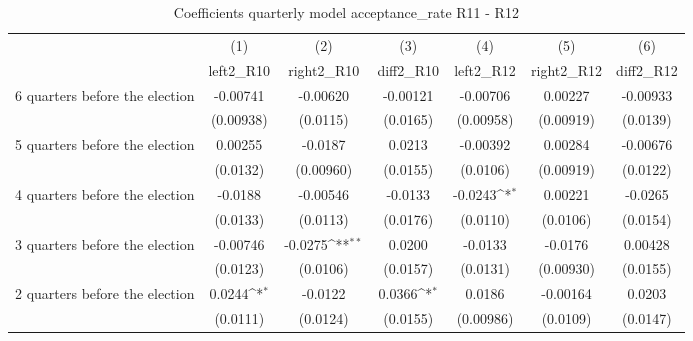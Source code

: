 \begin{table}[!ht]\centering \footnotesize
\def\sym#1{\ifmmode^{#1}\else\(^{#1}\)\fi}
\caption{Coefficients quarterly model acceptance\_rate R11 - R12}
\begin{tabular}{l*{6}{c}}
\hline\hline
                    &\multicolumn{1}{c}{(1)}&\multicolumn{1}{c}{(2)}&\multicolumn{1}{c}{(3)}&\multicolumn{1}{c}{(4)}&\multicolumn{1}{c}{(5)}&\multicolumn{1}{c}{(6)}\\
                    &\multicolumn{1}{c}{left2\_R10}&\multicolumn{1}{c}{right2\_R10}&\multicolumn{1}{c}{diff2\_R10}&\multicolumn{1}{c}{left2\_R12}&\multicolumn{1}{c}{right2\_R12}&\multicolumn{1}{c}{diff2\_R12}\\
\hline
 6 quarters before the election&    -0.00741         &    -0.00620         &    -0.00121         &    -0.00706         &     0.00227         &    -0.00933         \\
                    &   (0.00938)         &    (0.0115)         &    (0.0165)         &   (0.00958)         &   (0.00919)         &    (0.0139)         \\
[1em]
 5 quarters before the election&     0.00255         &     -0.0187         &      0.0213         &    -0.00392         &     0.00284         &    -0.00676         \\
                    &    (0.0132)         &   (0.00960)         &    (0.0155)         &    (0.0106)         &   (0.00919)         &    (0.0122)         \\
[1em]
 4 quarters before the election&     -0.0188         &    -0.00546         &     -0.0133         &     -0.0243\sym{*}  &     0.00221         &     -0.0265         \\
                    &    (0.0133)         &    (0.0113)         &    (0.0176)         &    (0.0110)         &    (0.0106)         &    (0.0154)         \\
[1em]
 3 quarters before the election&    -0.00746         &     -0.0275\sym{**} &      0.0200         &     -0.0133         &     -0.0176         &     0.00428         \\
                    &    (0.0123)         &    (0.0106)         &    (0.0157)         &    (0.0131)         &   (0.00930)         &    (0.0155)         \\
[1em]
 2 quarters before the election&      0.0244\sym{*}  &     -0.0122         &      0.0366\sym{*}  &      0.0186         &    -0.00164         &      0.0203         \\
                    &    (0.0111)         &    (0.0124)         &    (0.0155)         &   (0.00986)         &    (0.0109)         &    (0.0147)         \\

\end{tabular}
\end{table}

